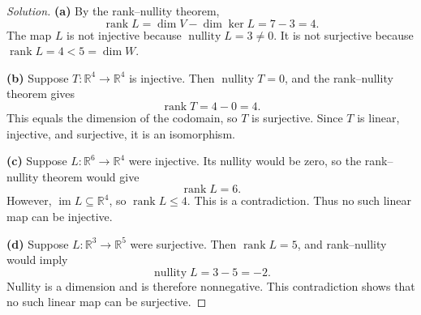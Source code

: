 \begin{proof}[Solution]
  \textbf{(a)} By the rank--nullity theorem,
    \[
      \operatorname{rank}L
        =\dim V-\dim\ker L=7-3=4.
    \]
    The map \(L\) is not injective because
    \(\operatorname{nullity}L=3\ne0\). It is not surjective because
    \(\operatorname{rank}L=4<5=\dim W\).

  \textbf{(b)} Suppose \(T\colon\mathbb{R}^4\to\mathbb{R}^4\) is injective.
    Then \(\operatorname{nullity}T=0\), and the rank--nullity theorem gives
    \[
      \operatorname{rank}T=4-0=4.
    \]
    This equals the dimension of the codomain, so \(T\) is surjective.
    Since \(T\) is linear, injective, and surjective, it is an isomorphism.

  \textbf{(c)} Suppose \(L\colon\mathbb{R}^6\to\mathbb{R}^4\) were injective.
    Its nullity would be zero, so the rank--nullity theorem would give
    \[
      \operatorname{rank}L=6.
    \]
    However, \(\operatorname{im}L\subseteq\mathbb{R}^4\), so
    \(\operatorname{rank}L\le4\). This is a contradiction. Thus no such
    linear map can be injective.

  \textbf{(d)} Suppose \(L\colon\mathbb{R}^3\to\mathbb{R}^5\) were surjective.
    Then \(\operatorname{rank}L=5\), and rank--nullity would imply
    \[
      \operatorname{nullity}L
        =3-5=-2.
    \]
    Nullity is a dimension and is therefore nonnegative. This
    contradiction shows that no such linear map can be surjective.
\end{proof}
